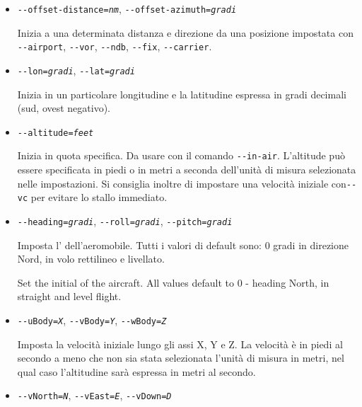 {\begin{itemize}
  Inizia in una particolare posizione di parcheggio sul supporto della portaerei.
  Deve essere usato assieme al comando \texttt{-$ $-carrier}.
  Il valore predefinito \`{e} la posizione di lancio.

  \item{\texttt{-$ $-offset-distance={\it nm}}, \texttt{-$ $-offset-azimuth={\it gradi}}}

  Inizia a una determinata distanza e direzione da una posizione impostata con \texttt{-$ $-airport},
  \texttt{-$ $-vor}, \texttt{-$ $-ndb}, \texttt{-$ $-fix}, \texttt{-$ $-carrier}.

  \item{\texttt{-$ $-lon={\it gradi}}, \texttt{-$ $-lat={\it gradi}}}

  Inizia in un particolare longitudine e la latitudine espressa in gradi decimali (sud, ovest negativo).

  \item{\texttt{-$ $-altitude={\it feet}}}

  Inizia in quota specifica. Da usare con il comando \texttt{-$ $-in-air}.
  L'altitude pu\`{o} essere specificata in piedi o in metri a seconda
  dell'unit\`{a} di misura selezionata nelle impostazioni. Si consiglia
  inoltre di impostare una velocit\`{a} iniziale con\texttt{-$ $-vc} per evitare lo stallo immediato.

  \item{\texttt{-$ $-heading={\it gradi}}, \texttt{-$ $-roll={\it gradi}}, \texttt{-$ $-pitch={\it gradi}}}

  Imposta l' dell'aeromobile. Tutti i valori di default sono:
  0 gradi in direzione Nord, in volo rettilineo e livellato.

  Set the initial  of the aircraft. All values default to 0 - heading North, in straight and level flight.

  \item{\texttt{-$ $-uBody={\it X}}, \texttt{-$ $-vBody={\it Y}}, \texttt{-$ $-wBody={\it Z}}}

  Imposta la velocit\`{a} iniziale lungo gli assi X, Y e Z. La velocit\`{a} \`{e} in piedi al secondo a meno che non
  sia stata selezionata l'unit\`{a} di misura in metri, nel qual caso l'altitudine sar\`{a} espressa in metri al secondo.

  \item{\texttt{-$ $-vNorth={\it N}}, \texttt{-$ $-vEast={\it E}}, \texttt{-$ $-vDown={\it D}}}


\end{itemize}}
